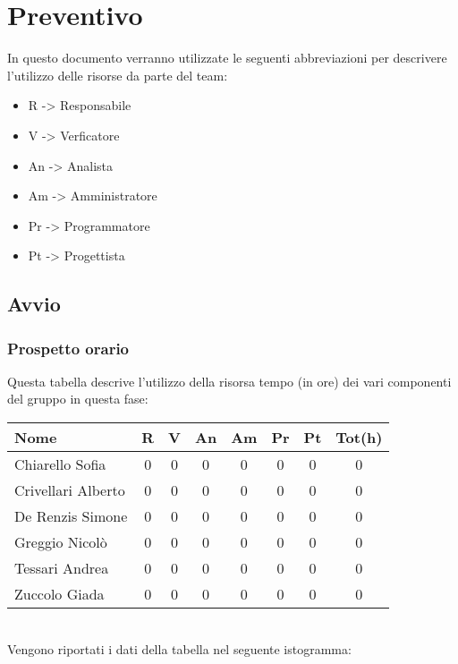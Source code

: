 \section{Preventivo}
In questo documento verranno utilizzate le seguenti abbreviazioni per descrivere l'utilizzo delle risorse da parte del team:
\begin{itemize}
	\item R  -> Responsabile
	\item V  -> Verficatore
	\item An -> Analista
	\item Am -> Amministratore
	\item Pr -> Programmatore
	\item Pt -> Progettista
\end{itemize}


\subsection{Avvio}

\subsubsection{Prospetto orario}
Questa tabella descrive l'utilizzo della risorsa tempo (in ore) dei vari componenti del gruppo in questa fase: \\

\begin{tabular}{|l|cccccc|c|}
\hline
Nome & R &  V & An & Am & Pr & Pt & Tot(h)\\
\hline
Chiarello Sofia & 0 & 0 & 0 & 0 & 0 & 0 & 0\\
Crivellari Alberto & 0 & 0 & 0 & 0 & 0 & 0 & 0\\
De Renzis Simone & 0 & 0 & 0 & 0 & 0 & 0 & 0\\
Greggio Nicolò & 0 & 0 & 0 & 0 & 0 & 0 & 0\\
Tessari Andrea & 0 & 0 & 0 & 0 & 0 & 0 & 0\\
Zuccolo Giada & 0 & 0 & 0 & 0 & 0 & 0 & 0\\
\hline
\end{tabular}
\\
Vengono riportati i dati della tabella nel seguente istogramma: \\

\pgfplotsset{width=10cm,compat=1.17}

